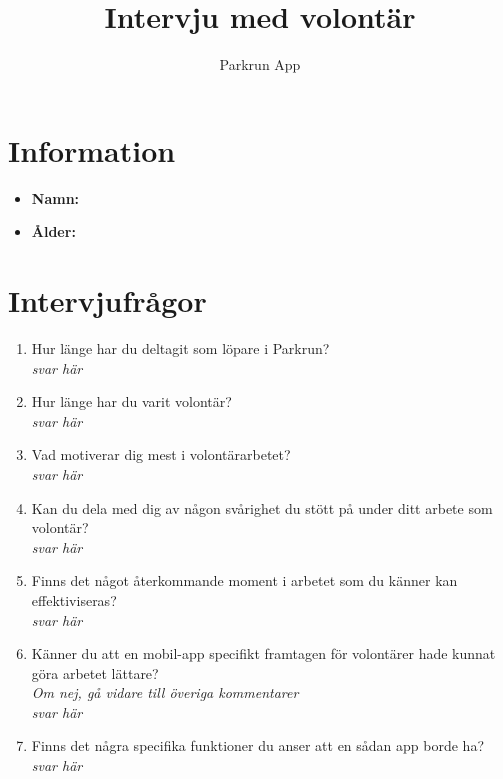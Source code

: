 \documentclass{article}
\title{\textbf{Intervju med volontär}}
\author{Parkrun App}
\date{}
\begin{document}
\maketitle
\thispagestyle{empty}
\section*{Information}
\begin{itemize}[label=]
    \item \textbf{Namn:} 
    \item \textbf{Ålder:} 
\end{itemize}

\section*{Intervjufrågor}
\begin{enumerate}[label=\textbf{Fråga \arabic*:}]
    \item Hur länge har du deltagit som löpare i Parkrun?\\
        \textit{svar här}
    \item Hur länge har du varit volontär?\\
        \textit{svar här}
    \item Vad motiverar dig mest i volontärarbetet?\\
        \textit{svar här}
    \item Kan du dela med dig av någon svårighet du stött på under ditt arbete som volontär?\\
        \textit{svar här}
    \item Finns det något återkommande moment i arbetet som du känner kan effektiviseras?\\
        \textit{svar här}
    \item Känner du att en mobil-app specifikt framtagen för volontärer hade kunnat göra arbetet lättare?\\
    \textit{Om nej, gå vidare till överiga kommentarer}\\
        \textit{svar här}
    \item Finns det några specifika funktioner du anser att en sådan app borde ha?\\
        \textit{svar här}
\end{enumerate}

\newpage
\end{document}
